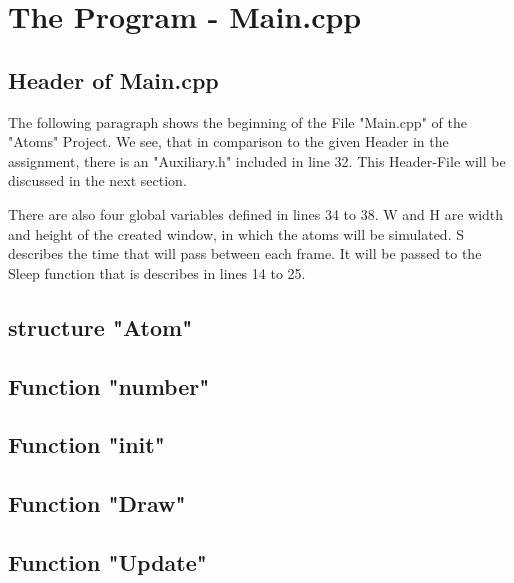 \documentclass[11pt,titlepage]{article}
\def\ContinueLineNumber{\lstset{firstnumber=last}}
\begin{document}
\newpage			
	\section{The Program - Main.cpp}	
		\subsection{Header of Main.cpp}
			The following paragraph shows the beginning of the File "Main.cpp" of the "Atoms" Project. 
			We see, that in comparison to the given Header in the assignment, there is an "Auxiliary.h" included in line 32. This Header-File will be discussed in the next section.
			
			There are also four global variables defined in lines 34 to 38. W and H are width and height of the created window, in which the atoms will be simulated.
			S describes the time that will pass between each frame. It will be passed to the Sleep function that is describes in lines 14 to 25.
			
			
			
		\subsection{structure "Atom"}	
			\ContinueLineNumber
			
			
		\subsection{Function "number"}
			\ContinueLineNumber
			
			
		\subsection{Function "init"}
			\ContinueLineNumber
			
			
		\subsection{Function "Draw"}
			\ContinueLineNumber
			
			
		\subsection{Function "Update"}
			\ContinueLineNumber
			
			
\end{document}
